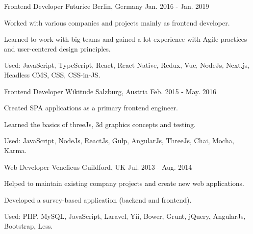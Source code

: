 

\begin{cventries}

  \cventry
    {Frontend Developer} %
    {Futurice} %
    {Berlin, Germany} %
    {Jan. 2016 - Jan. 2019} %
    {
      \begin{cvitems} %
        \item {Worked with various companies and projects mainly as frontend developer.}
        \item {Learned to work with big teams and gained a lot experience with Agile practices and user-centered design principles.}
        \item {Used: JavaScript, TypeScript, React, React Native, Redux, Vue, NodeJs, Next.js, Headless CMS, CSS, CSS-in-JS.}
      \end{cvitems}
    }

  \cventry
    {Frontend Developer} %
    {Wikitude} %
    {Salzburg, Austria} %
    {Feb. 2015 - May. 2016} %
    {
      \begin{cvitems} %
        \item {Created SPA applications as a primary frontend engineer.}
        \item {Learned the basics of threeJs, 3d graphics concepts and testing.}
        \item {Used: JavaScript, NodeJs, ReactJs, Gulp, AngularJs, ThreeJs, Chai, Mocha, Karma.}
      \end{cvitems}
    }

  \cventry
    {Web Developer} %
    {Veneficus} %
    {Guildford, UK} %
    {Jul. 2013 - Aug. 2014} %
    {
      \begin{cvitems} %
        \item {Helped to maintain existing company projects and create new web applications.}
        \item {Developed a survey-based application (backend and frontend).}
        \item {Used: PHP, MySQL, JavaScript, Laravel, Yii, Bower, Grunt, jQuery, AngularJs, Bootstrap, Less.}
      \end{cvitems}
    }

\end{cventries}
